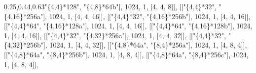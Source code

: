 \documentclass[
  10pt,
  letterpaper,
]{article}
\newenvironment{Shaded}{}{}
\newcommand{\FloatTok}[1]{\textcolor[rgb]{0.25,0.63,0.44}{#1}}
\newcommand{\NormalTok}[1]{#1}
\newcommand{\OperatorTok}[1]{\textcolor[rgb]{0.40,0.40,0.40}{#1}}
\newcommand{\StringTok}[1]{\textcolor[rgb]{0.25,0.44,0.63}{#1}}
\begin{document}
\begin{Shaded}
\begin{Highlighting}[]
\NormalTok{[[}\StringTok{"\{4,4\}*128"}\OperatorTok{,} \StringTok{"\{4,8\}*64b"}\NormalTok{]}\OperatorTok{,} \FloatTok{1024}\OperatorTok{,} \FloatTok{1}\OperatorTok{,}\NormalTok{ [}\FloatTok{4}\OperatorTok{,} \FloatTok{4}\OperatorTok{,} \FloatTok{8}\NormalTok{]]}\OperatorTok{,}
\NormalTok{[[}\StringTok{"\{4,4\}*32"}\OperatorTok{,} \StringTok{"\{4,16\}*256a"}\NormalTok{]}\OperatorTok{,} \FloatTok{1024}\OperatorTok{,} \FloatTok{1}\OperatorTok{,}\NormalTok{ [}\FloatTok{4}\OperatorTok{,} \FloatTok{4}\OperatorTok{,} \FloatTok{16}\NormalTok{]]}\OperatorTok{,}
\NormalTok{[[}\StringTok{"\{4,4\}*32"}\OperatorTok{,} \StringTok{"\{4,16\}*256b"}\NormalTok{]}\OperatorTok{,} \FloatTok{1024}\OperatorTok{,} \FloatTok{1}\OperatorTok{,}\NormalTok{ [}\FloatTok{4}\OperatorTok{,} \FloatTok{4}\OperatorTok{,} \FloatTok{16}\NormalTok{]]}\OperatorTok{,}
\NormalTok{[[}\StringTok{"\{4,4\}*64"}\OperatorTok{,} \StringTok{"\{4,16\}*128a"}\NormalTok{]}\OperatorTok{,} \FloatTok{1024}\OperatorTok{,} \FloatTok{1}\OperatorTok{,}\NormalTok{ [}\FloatTok{4}\OperatorTok{,} \FloatTok{4}\OperatorTok{,} \FloatTok{16}\NormalTok{]]}\OperatorTok{,}
\NormalTok{[[}\StringTok{"\{4,4\}*64"}\OperatorTok{,} \StringTok{"\{4,16\}*128b"}\NormalTok{]}\OperatorTok{,} \FloatTok{1024}\OperatorTok{,} \FloatTok{1}\OperatorTok{,}\NormalTok{ [}\FloatTok{4}\OperatorTok{,} \FloatTok{4}\OperatorTok{,} \FloatTok{16}\NormalTok{]]}\OperatorTok{,}
\NormalTok{[[}\StringTok{"\{4,4\}*32"}\OperatorTok{,} \StringTok{"\{4,32\}*256a"}\NormalTok{]}\OperatorTok{,} \FloatTok{1024}\OperatorTok{,} \FloatTok{1}\OperatorTok{,}\NormalTok{ [}\FloatTok{4}\OperatorTok{,} \FloatTok{4}\OperatorTok{,} \FloatTok{32}\NormalTok{]]}\OperatorTok{,}
\NormalTok{[[}\StringTok{"\{4,4\}*32"}\OperatorTok{,} \StringTok{"\{4,32\}*256b"}\NormalTok{]}\OperatorTok{,} \FloatTok{1024}\OperatorTok{,} \FloatTok{1}\OperatorTok{,}\NormalTok{ [}\FloatTok{4}\OperatorTok{,} \FloatTok{4}\OperatorTok{,} \FloatTok{32}\NormalTok{]]}\OperatorTok{,}
\NormalTok{[[}\StringTok{"\{4,8\}*64a"}\OperatorTok{,} \StringTok{"\{8,4\}*256a"}\NormalTok{]}\OperatorTok{,} \FloatTok{1024}\OperatorTok{,} \FloatTok{1}\OperatorTok{,}\NormalTok{ [}\FloatTok{4}\OperatorTok{,} \FloatTok{8}\OperatorTok{,} \FloatTok{4}\NormalTok{]]}\OperatorTok{,}
\NormalTok{[[}\StringTok{"\{4,8\}*64a"}\OperatorTok{,} \StringTok{"\{8,4\}*256b"}\NormalTok{]}\OperatorTok{,} \FloatTok{1024}\OperatorTok{,} \FloatTok{1}\OperatorTok{,}\NormalTok{ [}\FloatTok{4}\OperatorTok{,} \FloatTok{8}\OperatorTok{,} \FloatTok{4}\NormalTok{]]}\OperatorTok{,}
\NormalTok{[[}\StringTok{"\{4,8\}*64a"}\OperatorTok{,} \StringTok{"\{8,4\}*256c"}\NormalTok{]}\OperatorTok{,} \FloatTok{1024}\OperatorTok{,} \FloatTok{1}\OperatorTok{,}\NormalTok{ [}\FloatTok{4}\OperatorTok{,} \FloatTok{8}\OperatorTok{,} \FloatTok{4}\NormalTok{]]}\OperatorTok{,}

\end{Highlighting}
\end{Shaded}
\end{document}
